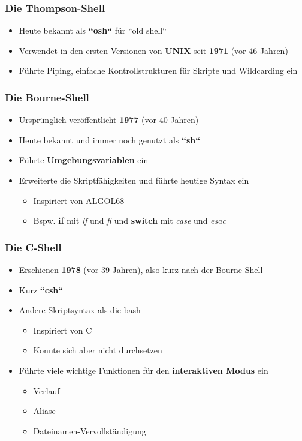 \begin{frame}
    \frametitle{Die Thompson-Shell}
    \begin{itemize}
        \item Heute bekannt als \textbf{``osh``} für ``old shell``
        \item Verwendet in den ersten Versionen von \textbf{UNIX} seit \textbf{1971} (vor 46 Jahren)
        \item Führte Piping, einfache Kontrollstrukturen für Skripte und Wildcarding ein
    \end{itemize}
\end{frame}

\begin{frame}
    \frametitle{Die Bourne-Shell}
    \begin{itemize}
        \item Ursprünglich veröffentlicht \textbf{1977} (vor 40 Jahren)
        \item Heute bekannt und immer noch genutzt als \textbf{``sh``}
        \item Führte \textbf{Umgebungsvariablen} ein
        \item Erweiterte die Skriptfähigkeiten und führte heutige Syntax ein
        \begin{itemize}
            \item Inspiriert von ALGOL68
            \item Bspw. \textbf{if} mit \textit{if} und \textit{fi} und \textbf{switch} mit \textit{case} und \textit{esac}
        \end{itemize}
    \end{itemize}
\end{frame}

\begin{frame}
    \frametitle{Die C-Shell}
    \begin{itemize}
        \item Erschienen \textbf{1978} (vor 39 Jahren), also kurz nach der Bourne-Shell
        \item Kurz \textbf{``csh``}
        \item Andere Skriptsyntax als die bash
        \begin{itemize}
            \item Inspiriert von C
            \item Konnte sich aber nicht durchsetzen
        \end{itemize}
        \item Führte viele wichtige Funktionen für den \textbf{interaktiven Modus} ein
        \begin{itemize}
            \item Verlauf
            \item Aliase
            \item Dateinamen-Vervollständigung
        \end{itemize}
    \end{itemize}
\end{frame}

